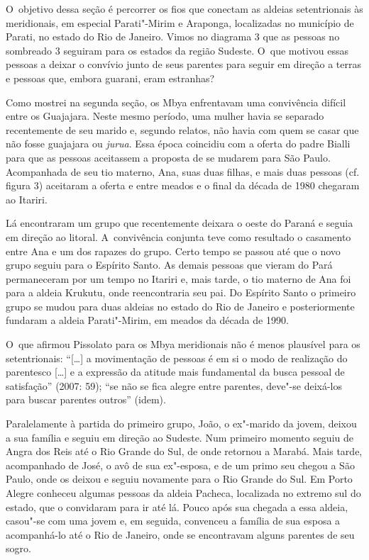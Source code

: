 O~objetivo dessa seção é percorrer os fios que conectam as aldeias
setentrionais às meridionais, em especial Parati"-Mirim e Araponga,
localizadas no município de Parati, no estado do Rio de Janeiro. Vimos
no diagrama 3 que as pessoas no sombreado 3 seguiram para os estados da
região Sudeste. O~que motivou essas pessoas a deixar o convívio junto
de seus parentes para seguir em direção a terras e pessoas que, embora
guarani, eram estranhas?

Como mostrei na segunda seção, os Mbya enfrentavam uma convivência
difícil entre os Guajajara. Neste mesmo período, uma mulher havia se
separado recentemente de seu marido e, segundo relatos, não havia com
quem se casar que não fosse guajajara ou \emph{jurua}. Essa época coincidiu
com a oferta do padre Bialli para que as pessoas aceitassem a proposta
de se mudarem para São Paulo. Acompanhada de seu tio materno, Ana, suas
duas filhas, e mais duas pessoas (cf. figura 3) aceitaram a oferta e
entre meados e o final da década de 1980 chegaram ao Itariri.

Lá encontraram um grupo que recentemente deixara o oeste do Paraná e
seguia em direção ao litoral. A~convivência conjunta teve como
resultado o casamento entre Ana e um dos rapazes do grupo. Certo tempo
se passou até que o novo grupo seguiu para o Espírito Santo. As demais
pessoas que vieram do Pará permaneceram por um tempo no Itariri e, mais
tarde, o tio materno de Ana foi para a aldeia Krukutu, onde
reencontraria seu pai. Do Espírito Santo o primeiro grupo se mudou para
duas aldeias no estado do Rio de Janeiro e posteriormente fundaram a
aldeia Parati"-Mirim, em meados da década de 1990.

O~que afirmou Pissolato para os Mbya meridionais não é menos plausível
para os setentrionais: ``[\ldots{}] a movimentação de pessoas é em si o modo
de realização do parentesco [\ldots{}] e a expressão da atitude mais
fundamental da busca pessoal de satisfação'' (2007: 59); ``se não se fica
alegre entre parentes, deve"-se deixá-los para buscar parentes outros''
(idem).

Paralelamente à partida do primeiro grupo, João, o ex"-marido da jovem,
deixou a sua família e seguiu em direção ao Sudeste. Num primeiro
momento seguiu de Angra dos Reis até o Rio Grande do Sul, de onde
retornou a Marabá. Mais tarde, acompanhado de José, o avô de sua
ex"-esposa, e de um primo seu chegou a São Paulo, onde os deixou e
seguiu novamente para o Rio Grande do Sul. Em Porto Alegre conheceu
algumas pessoas da aldeia Pacheca, localizada no extremo sul do estado,
que o convidaram para ir até lá. Pouco após sua chegada a essa aldeia,
casou"-se com uma jovem e, em seguida, convenceu a família de sua esposa
a acompanhá-lo até o Rio de Janeiro, onde se encontravam alguns
parentes de seu sogro.

